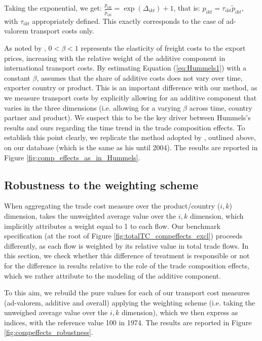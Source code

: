 \documentclass[a4paper,11pt]{article}
\begin{document}
Taking the exponential, we get: $\frac{p_{ikt}}{\widetilde{p}_{ikt}}  = \exp (\Delta_{ikt})+1$, that is: $p_{ikt} = \tau_{ikt} \widetilde{p}_{ikt}$, with $\tau_{ikt}$ appropriately defined. This exactly corresponds to the case of ad-valorem transport costs only.


As noted by \cite{hummels_skiba}, $0<\beta<1$ represents the elasticity of freight costs to the export prices, increasing with the relative weight of the additive component in international transport costs.
By estimating Equation (\ref{eq:Hummels1}) with a constant $\beta$, \cite{hummels2007} assumes that the share of additive costs does not vary over time, exporter country or product.
This is an important difference with our method, as we measure transport costs by explicitly allowing for an additive component that varies in the three dimensions (i.e. allowing for a varying $\beta$ across time, country partner and product). We suspect this to be the key driver between Hummels's results and ours regarding the time trend in the trade composition effects. To establish this point clearly, we replicate the method adopted by \cite{hummels2007}, outlined above, on our database (which is the same as his until 2004).
The results are reported in Figure \ref{fig:comp_effects_as_in_Hummels}.


\subsection{Robustness to the weighting scheme \label{app:compeffects_weights}}

When aggregating the trade cost measure over the product/country ($i,k$) dimension, \cite{hummels2007} takes the unweighted average value over the $i,k$ dimension, which implicitly attributes a weight equal to 1 to each flow.
Our benchmark specification  (at the root of Figure \ref{fig:totalTC_compeffects_excl}) proceeds differently, as each flow is weighted by its relative value in total trade flows. In this section, we check whether this difference of treatment is responsible or not for the difference in results relative to the role of the trade composition effects, which we rather attribute to the modeling of the additive component.

To this aim, we rebuild the pure values for each of our transport cost measures (ad-valorem, additive and overall) applying the \cite{hummels2007} weighting scheme (i.e. taking the unweighed average value over the $i,k$ dimension), which we then express as indices, with the reference value 100 in 1974.
The results are reported in Figure \ref{fig:compeffects_robustness}.
\end{document}

